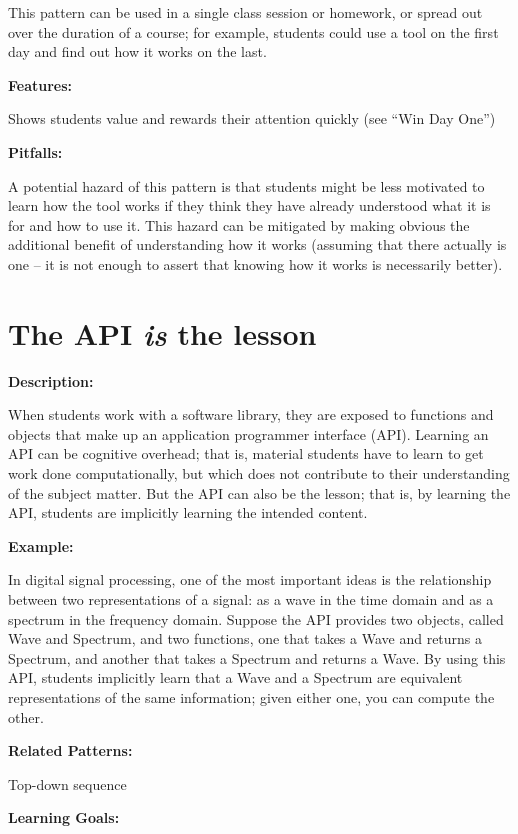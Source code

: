 \documentclass[]{book}
\begin{document}
This pattern can be used in a single class session or homework, or
spread out over the duration of a course; for example, students could
use a tool on the first day and find out how it works on the last.

\textbf{Features:}

Shows students value and rewards their attention quickly (see ``Win Day
One'')

\textbf{Pitfalls:}

A potential hazard of this pattern is that students might be less
motivated to learn how the tool works if they think they have already
understood what it is for and how to use it. This hazard can be
mitigated by making obvious the additional benefit of understanding how
it works (assuming that there actually is one -- it is not enough to
assert that knowing how it works is necessarily better).

\section{\texorpdfstring{The API \emph{is} the
lesson}{The API is the lesson}}\label{the-api-is-the-lesson}

\textbf{Description:}

When students work with a software library, they are exposed to
functions and objects that make up an application programmer interface
(API). Learning an API can be cognitive overhead; that is, material
students have to learn to get work done computationally, but which does
not contribute to their understanding of the subject matter. But the API
can also be the lesson; that is, by learning the API, students are
implicitly learning the intended content.

\textbf{Example:}

In digital signal processing, one of the most important ideas is the
relationship between two representations of a signal: as a wave in the
time domain and as a spectrum in the frequency domain. Suppose the API
provides two objects, called Wave and Spectrum, and two functions, one
that takes a Wave and returns a Spectrum, and another that takes a
Spectrum and returns a Wave. By using this API, students implicitly
learn that a Wave and a Spectrum are equivalent representations of the
same information; given either one, you can compute the other.

\textbf{Related Patterns:}

Top-down sequence

\textbf{Learning Goals:}
\end{document}
